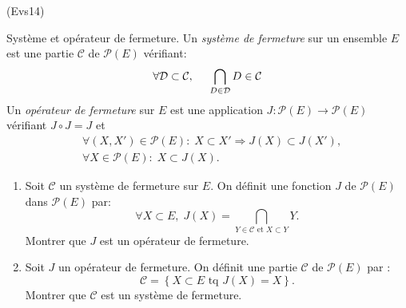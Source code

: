 \begin{tiny}(Evs14)\end{tiny} Système et opérateur de fermeture.\newline {} 
Un \emph{système de fermeture} sur un ensemble $E$ est une partie $\mathcal{C}$ de $\mathcal{P}(E)$ vérifiant:
\[
  \forall \mathcal{D} \subset \mathcal{C},\hspace{0.5cm} \bigcap_{D \in \mathcal{D}} D \in \mathcal{C}
\]
Un \emph{opérateur de fermeture} sur $E$ est une application $J:\mathcal{P}(E)\rightarrow \mathcal{P}(E)$ vérifiant $J \circ J  = J$ et
\begin{align*}
  &\forall(X,X')\in \mathcal{P}(E):\; X\subset X' \Rightarrow J(X) \subset J(X'),\\
  &\forall X \in \mathcal{P}(E):\; X\subset J(X).
\end{align*}
\begin{enumerate}
  \item Soit $\mathcal{C}$ un système de fermeture sur $E$.\newline
  On définit une fonction $J$ de $\mathcal{P}(E)$ dans $\mathcal{P}(E)$ par:
\[
  \forall X \subset E, \;J(X)
  = \bigcap_{Y \in \mathcal{C} \text{ et } X \subset Y} Y.
\]
Montrer que $J$ est un opérateur de fermeture.
  \item Soit $J$ un opérateur de fermeture.\newline
  On définit une partie $\mathcal{C}$ de $\mathcal{P}(E)$ par :
\[
  \mathcal{C} = \left\lbrace X \subset E \text{ tq } J(X) = X \right\rbrace.
\]
Montrer que $\mathcal{C}$ est un système de fermeture.
\end{enumerate}

